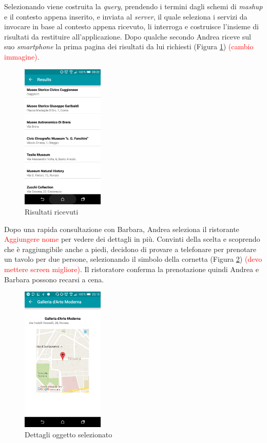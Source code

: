 Selezionando  viene costruita la \emph{query}, prendendo i termini dagli schemi di \emph{mashup} e il contesto appena inserito, e inviata al \emph{server}, il quale seleziona i servizi da invocare in base al contesto appena ricevuto, li interroga e costruisce l'insieme di risultati da restituire all'applicazione. Dopo qualche secondo Andrea riceve sul suo \emph{smartphone} la prima pagina dei risultati da lui richiesti (Figura \ref{fig:usecase-results}) \textcolor{red}{(cambio immagine)}.

\begin{figure}[H]
	\centering
	\includegraphics[width=0.35\textwidth]{4-progettazione-alto-livello/Immagini/results_caso_d'uso.png}
	\caption{Risultati ricevuti}\label{fig:usecase-results}
\end{figure} 

Dopo una rapida consultazione con Barbara, Andrea seleziona il ristorante \textcolor{red}{Aggiungere nome} per vedere dei dettagli in più. Convinti della scelta e scoprendo che è raggiungibile anche a piedi, decidono di provare a telefonare per prenotare un tavolo per due persone, selezionando il simbolo della cornetta (Figura \ref{fig:usecase-details}) \textcolor{red}{(devo mettere screen migliore)}. Il ristoratore conferma la prenotazione quindi Andrea e Barbara possono recarsi a cena. %

\begin{figure}[H]
	\centering
	\includegraphics[width=0.35\textwidth]{4-progettazione-alto-livello/Immagini/details_caso_d'uso.png}
	\caption{Dettagli oggetto selezionato}\label{fig:usecase-details}
\end{figure} 
